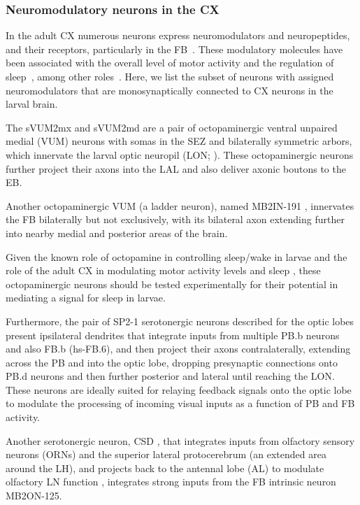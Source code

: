         \subsubsection{Neuromodulatory neurons in the CX}
        In the adult CX numerous neurons express neuromodulators and neuropeptides, and their receptors, particularly in the FB~\citep{kahsai2011neuromodulators, kahsai2012distribution}. These modulatory molecules have been associated with the overall level of motor activity and the regulation of sleep~\citep{donlea2019sleep}, among other roles~\citep{PfeifferHomberg2014}. Here, we list the subset of neurons with assigned neuromodulators that are monosynaptically connected to CX neurons in the larval brain.

        The sVUM2mx and sVUM2md are a pair of octopaminergic ventral unpaired medial (VUM) neurons with somas in the SEZ and bilaterally symmetric arbors, which innervate the larval optic neuropil (LON; \citep{larderet2017opticlobe}).
        These octopaminergic neurons further project their axons into the LAL and also deliver axonic boutons to the EB.

        Another octopaminergic VUM (a ladder neuron), named MB2IN-191 \citep{eschbach2020recurrent}, innervates the FB bilaterally but not exclusively, with its bilateral axon extending further into nearby medial and posterior areas of the brain.

        Given the known role of octopamine in controlling sleep/wake in larvae \citep{szuperak2018sleep} and the role of the adult CX in modulating motor activity levels and sleep \citep{PfeifferHomberg2014, ShaferKeene2021sleep}, these octopaminergic neurons should be tested experimentally for their potential in mediating a signal for sleep in larvae.

        Furthermore, the pair of SP2-1 serotonergic neurons described for the optic lobes \citep{larderet2017opticlobe} present ipsilateral dendrites that integrate inputs from multiple PB.b neurons and also FB.b (hs-FB.6), and then project their axons contralaterally, extending across the PB and into the optic lobe, dropping presynaptic connections onto PB.d neurons and then further posterior and lateral until reaching the LON. These neurons are ideally suited for relaying feedback signals onto the optic lobe to modulate the processing of incoming visual inputs as a function of PB and FB activity.

        Another serotonergic neuron, CSD \citep{berck2016wiring}, that integrates inputs from olfactory sensory neurons (ORNs) and the superior lateral protocerebrum (an extended area around the LH), and projects back to the antennal lobe (AL) to modulate olfactory LN function \citep{vogt2021internalstate}, integrates strong inputs from the FB intrinsic neuron MB2ON-125.

